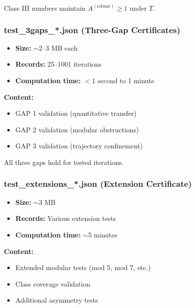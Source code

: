 \documentclass[11pt,a4paper]{article}
\theoremstyle{definition}
\begin{document}
\begin{criticalbox}[title={Key Claim}]
Class III numbers maintain $A^{(\text{robust})} \geq 1$ under $T$.
\end{criticalbox}

\subsubsection{test\_3gaps\_*.json (Three-Gap Certificates)}

\begin{itemize}[leftmargin=*]
    \item \textbf{Size:} $\sim$2--3 MB each
    \item \textbf{Records:} 25--1001 iterations
    \item \textbf{Computation time:} $<$1 second to 1 minute
\end{itemize}

\textbf{Content:}
\begin{itemize}
    \item GAP 1 validation (quantitative transfer)
    \item GAP 2 validation (modular obstructions)
    \item GAP 3 validation (trajectory confinement)
\end{itemize}

\begin{criticalbox}[title={Key Claim}]
All three gaps hold for tested iterations.
\end{criticalbox}

\subsubsection{test\_extensions\_*.json (Extension Certificate)}

\begin{itemize}[leftmargin=*]
    \item \textbf{Size:} $\sim$3 MB
    \item \textbf{Records:} Various extension tests
    \item \textbf{Computation time:} $\sim$5 minutes
\end{itemize}

\textbf{Content:}
\begin{itemize}
    \item Extended modular tests (mod 5, mod 7, etc.)
    \item Class coverage validation
    \item Additional asymmetry tests
\end{itemize}
\end{document}
